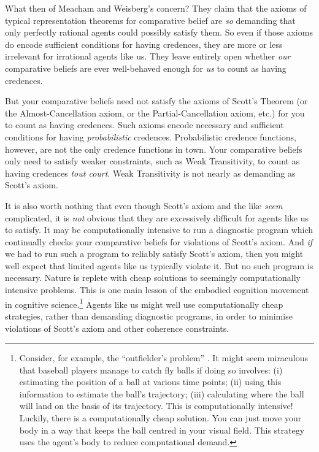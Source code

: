 What then of Meacham and Weisberg's concern? They claim that the axioms of typical representation theorems for comparative belief are \textit{so} demanding that only perfectly rational agents could possibly satisfy them. So even if those axioms do encode sufficient conditions for having credences, they are more or less irrelevant for irrational agents like us. They leave entirely open whether \textit{our} comparative beliefs are ever well-behaved enough for \textit{us} to count as having credences.

But your comparative beliefs need not satisfy the axioms of Scott's Theorem (or the Almost-Cancellation axiom, or the Partial-Cancellation axiom, etc.) for you to count as having credences. Such axioms encode necessary and sufficient conditions for having \textit{probabilistic} credences. Probabilistic credence functions, however, are not the only credence functions in town. Your comparative beliefs only need to satisfy weaker constraints, such as Weak Transitivity, to count as having credences \textit{tout court}. Weak Transitivity is not nearly as demanding as Scott's axiom.

It is also worth nothing that even though Scott's axiom and the like \textit{seem} complicated, it is \textit{not} obvious that they are excessively difficult for agents like us to satisfy. It may be computationally intensive to run a diagnostic program which continually checks your comparative beliefs for violations of Scott's axiom. And \textit{if} we had to run such a program to reliably satisfy Scott's axiom, then you might well expect that limited agents like us typically violate it. But no such program is necessary. Nature is replete with cheap solutions to seemingly computationally intensive problems. This is one main lesson of the embodied cognition movement in cognitive science.\footnote{Consider, for example, the ``outfielder's problem'' \citep[p. 12]{Clark2015}. It might seem miraculous that baseball players manage to catch fly balls if doing so involves: (i) estimating the position of a ball at various time points; (ii) using this information to estimate the ball's trajectory; (iii) calculating where the ball will land on the basis of its trajectory. This is computationally intensive! Luckily, there is a computationally cheap solution. You can just move your body in a way that keeps the ball centred in your visual field. This strategy uses the agent's body to reduce computational demand.} Agents like us might well use computationally cheap strategies, rather than demanding diagnostic programs, in order to minimise violations of Scott's axiom and other coherence constraints.

